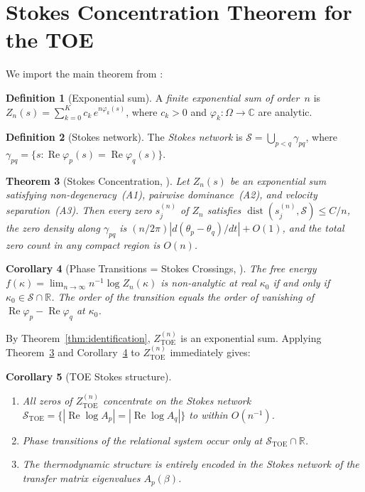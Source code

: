 \documentclass[12pt]{article}
\newtheorem{theorem}{Theorem}[section]
\newtheorem{corollary}[theorem]{Corollary}
\theoremstyle{definition}
\newtheorem{definition}[theorem]{Definition}
\theoremstyle{remark}
\newcommand{\re}{\operatorname{Re}}
\newcommand{\dist}{\operatorname{dist}}
\newcommand{\TOE}{\mathrm{TOE}}
\begin{document}
\section{Stokes Concentration Theorem for the TOE}
\label{sec:stokes}

We import the main theorem from \cite{OlbrykPsi2026}:

\begin{definition}[Exponential sum]\label{def:expsum}
A \emph{finite exponential sum of order~$n$} is
$Z_n(s) = \sum_{k=0}^K c_k\,e^{n\varphi_k(s)}$,
where $c_k > 0$ and $\varphi_k : \Omega \to \mathbb{C}$ are analytic.
\end{definition}

\begin{definition}[Stokes network]
The \emph{Stokes network} is
$\mathcal{S} = \bigcup_{p<q}\gamma_{pq}$,
where $\gamma_{pq} = \{s : \re\varphi_p(s) = \re\varphi_q(s)\}$.
\end{definition}

\begin{theorem}[Stokes Concentration, {\cite[Thm.~1]{OlbrykPsi2026}}]
\label{thm:stokes}
Let $Z_n(s)$ be an exponential sum satisfying non-degeneracy~(A1),
pairwise dominance~(A2), and velocity separation~(A3).
Then every zero $s_j^{(n)}$ of $Z_n$ satisfies
$\dist(s_j^{(n)}, \mathcal{S}) \leq C/n$,
the zero density along $\gamma_{pq}$ is
$(n/2\pi)|d(\theta_p-\theta_q)/dt| + O(1)$,
and the total zero count in any compact region is $O(n)$.
\end{theorem}

\begin{corollary}[Phase Transitions = Stokes Crossings, {\cite[Thm.~PT]{OlbrykPsi2026}}]
\label{cor:phase}
The free energy $f(\kappa) = \lim_{n\to\infty} n^{-1}\log Z_n(\kappa)$
is non-analytic at real $\kappa_0$ if and only if
$\kappa_0 \in \mathcal{S} \cap \mathbb{R}$.
The order of the transition equals the order of vanishing of
$\re\varphi_p - \re\varphi_q$ at $\kappa_0$.
\end{corollary}

By Theorem~\ref{thm:identification}, $Z_\TOE^{(n)}$ is an exponential
sum.  Applying Theorem~\ref{thm:stokes} and Corollary~\ref{cor:phase}
to $Z_\TOE^{(n)}$ immediately gives:

\begin{corollary}[TOE Stokes structure]\label{cor:TOE_stokes}
\begin{enumerate}
\item[\textup{(i)}] All zeros of $Z_\TOE^{(n)}$ concentrate on the
  Stokes network $\mathcal{S}_\TOE = \{|\re\log A_p| = |\re\log A_q|\}$
  to within $O(n^{-1})$.
\item[\textup{(ii)}] Phase transitions of the relational system
  occur only at $\mathcal{S}_\TOE \cap \mathbb{R}$.
\item[\textup{(iii)}] The thermodynamic structure is entirely encoded
  in the Stokes network of the transfer matrix eigenvalues $A_p(\beta)$.
\end{enumerate}
\end{corollary}
\end{document}
